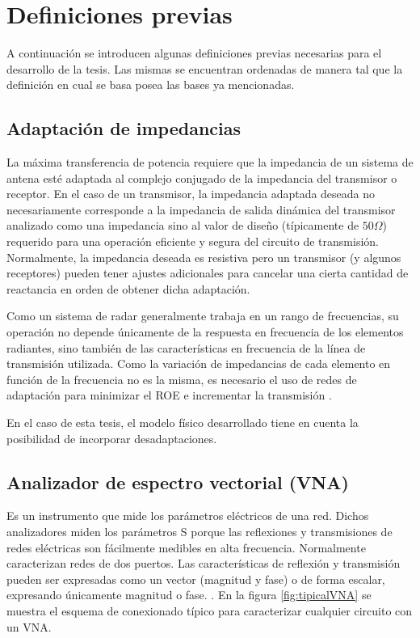 \section{Definiciones previas} \label{sc:definitions}

A continuación se introducen algunas definiciones previas necesarias para el desarrollo de la tesis. Las mismas se encuentran
ordenadas de manera tal que la definición en cual se basa posea las bases ya mencionadas.


\subsection{Adaptación de impedancias}
La máxima transferencia de potencia requiere que la impedancia de un sistema de antena esté adaptada al complejo conjugado de la
impedancia del transmisor o receptor. En el caso de un transmisor, la impedancia adaptada deseada no necesariamente corresponde a
la impedancia de salida dinámica del transmisor analizado como una impedancia sino al valor de diseño (típicamente de
$50 \Omega$) requerido para una operación eficiente y segura del circuito de transmisión. Normalmente, la impedancia deseada es
resistiva pero un transmisor (y algunos receptores) pueden tener ajustes adicionales para cancelar una cierta cantidad de
reactancia en orden de obtener dicha adaptación.

Como un sistema de radar generalmente trabaja en un rango de frecuencias, su operación no depende únicamente de la respuesta en
frecuencia de los elementos radiantes, sino también de las características en frecuencia de la línea de transmisión utilizada.
Como la variación de impedancias de cada elemento en función de la frecuencia no es la misma, es necesario el uso de redes de
adaptación para minimizar el ROE e incrementar la transmisión \cite{Balanis2012}.

En el caso de esta tesis, el modelo físico desarrollado tiene en cuenta la posibilidad de incorporar desadaptaciones.


\subsection{Analizador de espectro vectorial (VNA)}

Es un instrumento que mide los parámetros eléctricos de una red. Dichos analizadores miden los parámetros S porque las
reflexiones y transmisiones de redes eléctricas son fácilmente medibles en alta frecuencia. Normalmente caracterizan redes de
dos puertos. Las características de reflexión y transmisión pueden ser expresadas como un vector (magnitud y fase) o de forma
escalar, expresando únicamente magnitud o fase. \cite{AgilentTechnologies2012}. En la figura \ref{fig:tipicalVNA} se muestra el
esquema de conexionado típico para caracterizar cualquier circuito con un VNA.

